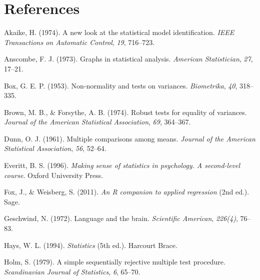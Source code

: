 \documentclass[
  a4paper,
]{book}
\newlength{\cslhangindent}
\newlength{\cslentryspacingunit} %
\newenvironment{CSLReferences}[2] %
 {%
  \setlength{\parindent}{0pt}
  \ifodd #1
  \let\oldpar\par
  \def\par{\hangindent=\cslhangindent\oldpar}
  \fi
  \setlength{\parskip}{#2\cslentryspacingunit}
 }%
 {}
\begin{document}

\hypertarget{references}{%
\chapter*{References}\label{references}}


\hypertarget{refs}{}
\begin{CSLReferences}{1}{0}
\leavevmode{}%
Akaike, H. (1974). A new look at the statistical model identification.
\emph{IEEE Transactions on Automatic Control}, \emph{19}, 716--723.

\leavevmode{}%
Anscombe, F. J. (1973). Graphs in statistical analysis. \emph{American
Statistician}, \emph{27}, 17--21.

\leavevmode{}%
Box, G. E. P. (1953). Non-normality and tests on variances.
\emph{Biometrika}, \emph{40}, 318--335.

\leavevmode{}%
Brown, M. B., \& Forsythe, A. B. (1974). Robust tests for equality of
variances. \emph{Journal of the American Statistical Association},
\emph{69}, 364--367.

\leavevmode{}%
Dunn, O. J. (1961). Multiple comparisons among means. \emph{Journal of
the American Statistical Association}, \emph{56}, 52--64.

\leavevmode{}%
Everitt, B. S. (1996). \emph{Making sense of statistics in psychology. A
second-level course}. Oxford University Press.

\leavevmode{}%
Fox, J., \& Weisberg, S. (2011). \emph{An {R} companion to applied
regression} (2nd ed.). Sage.

\leavevmode{}%
Geschwind, N. (1972). Language and the brain. \emph{Scientific
American}, \emph{226(4)}, 76--83.

\leavevmode{}%
Hays, W. L. (1994). \emph{Statistics} (5th ed.). Harcourt Brace.

\leavevmode{}%
Holm, S. (1979). A simple sequentially rejective multiple test
procedure. \emph{Scandinavian Journal of Statistics}, \emph{6}, 65--70.


\end{CSLReferences}
\end{document}
